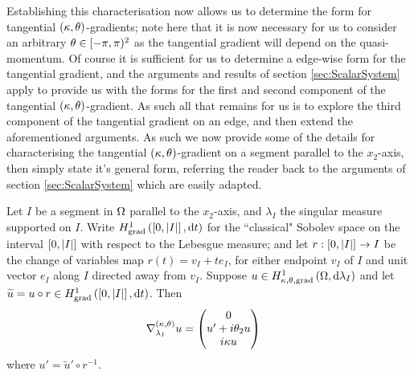 Establishing this characterisation now allows us to determine the form for tangential $\left( \kappa, \theta \right)$-gradients; note here that it is now necessary for us to consider an arbitrary $\theta\in[-\pi,\pi)^2$ as the tangential gradient will depend on the quasi-momentum.
Of course it is sufficient for us to determine a edge-wise form for the tangential gradient, and the arguments and results of section \ref{sec:ScalarSystem} apply to provide us with the forms for the first and second component of the tangential $\left( \kappa, \theta \right)$-gradient.
As such all that remains for us is to explore the third component of the tangential gradient on an edge, and then extend the aforementioned arguments.
As such we now provide some of the details for characterising the tangential $\left( \kappa, \theta \right)$-gradient on a segment parallel to the $x_2$-axis, then simply state it's general form, referring the reader back to the arguments of section \ref{sec:ScalarSystem} which are easily adapted.
\begin{prop} \label{prop:ktTangentialGradientSegment}
	Let $I$ be a segment in $\Omega$ parallel to the $x_2$-axis, and $\lambda_I$ the singular measure supported on $I$.
	Write $H^1_\mathrm{grad}\left( \left[ 0,\left\lvert I \right\rvert \right], \mathrm{d}t \right)$ for the ``classical" Sobolev space on the interval $\left[ 0,\left\lvert I \right\rvert \right]$ with respect to the Lebesgue measure; and let $r:\left[ 0,\left\lvert I \right\rvert \right]\rightarrow I$ be the change of variables map $r(t) = v_I + te_I$, for either endpoint $v_I$ of $I$ and unit vector $e_I$ along $I$ directed away from $v_I$.
	Suppose $u\in H^1_{\kappa,\theta,\mathrm{grad}}\left( \Omega, \mathrm{d}\lambda_I \right)$ and let $\widetilde{u} = u\circ r\in H^1_\mathrm{grad}\left( \left[ 0,\left\lvert I \right\rvert \right], \mathrm{d}t \right)$.
	Then
	\begin{align*}
		\nabla^{\left( \kappa, \theta \right)}_{\lambda_I}u &= \begin{pmatrix} 0 \\ u' + i\theta_2 u \\ i\kappa u\end{pmatrix}
	\end{align*}
	where $u' = \widetilde{u}'\circ r^{-1}$.
\end{prop}
